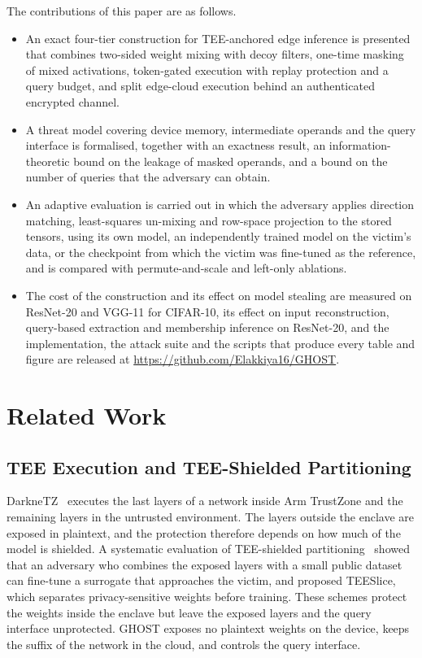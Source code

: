 \documentclass[lettersize,journal]{IEEEtran}
\begin{document}
The contributions of this paper are as follows.
\begin{itemize}
\item An exact four-tier construction for TEE-anchored edge inference is presented that combines two-sided weight mixing with decoy filters, one-time masking of mixed activations, token-gated execution with replay protection and a query budget, and split edge-cloud execution behind an authenticated encrypted channel.
\item A threat model covering device memory, intermediate operands and the query interface is formalised, together with an exactness result, an information-theoretic bound on the leakage of masked operands, and a bound on the number of queries that the adversary can obtain.
\item An adaptive evaluation is carried out in which the adversary applies direction matching, least-squares un-mixing and row-space projection to the stored tensors, using its own model, an independently trained model on the victim's data, or the checkpoint from which the victim was fine-tuned as the reference, and is compared with permute-and-scale and left-only ablations.
\item The cost of the construction and its effect on model stealing are measured on ResNet-20 and VGG-11 for CIFAR-10, its effect on input reconstruction, query-based extraction and membership inference on ResNet-20, and the implementation, the attack suite and the scripts that produce every table and figure are released at \url{https://github.com/Elakkiya16/GHOST}.
\end{itemize}

\section{Related Work}
\label{sec:related}

\subsection{TEE Execution and TEE-Shielded Partitioning}
DarkneTZ~\cite{mo2020darknetz} executes the last layers of a network inside Arm TrustZone and the remaining layers in the untrusted environment. The layers outside the enclave are exposed in plaintext, and the protection therefore depends on how much of the model is shielded. A systematic evaluation of TEE-shielded partitioning~\cite{zhang2024nplo} showed that an adversary who combines the exposed layers with a small public dataset can fine-tune a surrogate that approaches the victim, and proposed TEESlice, which separates privacy-sensitive weights before training. These schemes protect the weights inside the enclave but leave the exposed layers and the query interface unprotected. GHOST exposes no plaintext weights on the device, keeps the suffix of the network in the cloud, and controls the query interface.
\end{document}
